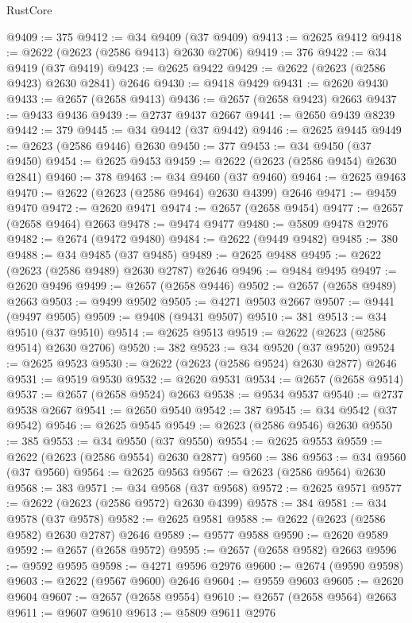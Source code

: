 \begin{lexlean}{RustCore}
\begin{coremodule}
@9409 := 375
@9412 := @34 @9409 (@37 @9409)
@9413 := @2625 @9412
@9418 := @2622 (@2623 (@2586 @9413) @2630 @2706)
@9419 := 376
@9422 := @34 @9419 (@37 @9419)
@9423 := @2625 @9422
@9429 := @2622 (@2623 (@2586 @9423) @2630 @2841) @2646
@9430 := @9418 @9429
@9431 := @2620 @9430
@9433 := @2657 (@2658 @9413)
@9436 := @2657 (@2658 @9423) @2663
@9437 := @9433 @9436
@9439 := @2737 @9437 @2667
@9441 := @2650 @9439 @8239
@9442 := 379
@9445 := @34 @9442 (@37 @9442)
@9446 := @2625 @9445
@9449 := @2623 (@2586 @9446) @2630
@9450 := 377
@9453 := @34 @9450 (@37 @9450)
@9454 := @2625 @9453
@9459 := @2622 (@2623 (@2586 @9454) @2630 @2841)
@9460 := 378
@9463 := @34 @9460 (@37 @9460)
@9464 := @2625 @9463
@9470 := @2622 (@2623 (@2586 @9464) @2630 @4399) @2646
@9471 := @9459 @9470
@9472 := @2620 @9471
@9474 := @2657 (@2658 @9454)
@9477 := @2657 (@2658 @9464) @2663
@9478 := @9474 @9477
@9480 := @5809 @9478 @2976
@9482 := @2674 (@9472 @9480)
@9484 := @2622 (@9449 @9482)
@9485 := 380
@9488 := @34 @9485 (@37 @9485)
@9489 := @2625 @9488
@9495 := @2622 (@2623 (@2586 @9489) @2630 @2787) @2646
@9496 := @9484 @9495
@9497 := @2620 @9496
@9499 := @2657 (@2658 @9446)
@9502 := @2657 (@2658 @9489) @2663
@9503 := @9499 @9502
@9505 := @4271 @9503 @2667
@9507 := @9441 (@9497 @9505)
@9509 := @9408 (@9431 @9507)
@9510 := 381
@9513 := @34 @9510 (@37 @9510)
@9514 := @2625 @9513
@9519 := @2622 (@2623 (@2586 @9514) @2630 @2706)
@9520 := 382
@9523 := @34 @9520 (@37 @9520)
@9524 := @2625 @9523
@9530 := @2622 (@2623 (@2586 @9524) @2630 @2877) @2646
@9531 := @9519 @9530
@9532 := @2620 @9531
@9534 := @2657 (@2658 @9514)
@9537 := @2657 (@2658 @9524) @2663
@9538 := @9534 @9537
@9540 := @2737 @9538 @2667
@9541 := @2650 @9540
@9542 := 387
@9545 := @34 @9542 (@37 @9542)
@9546 := @2625 @9545
@9549 := @2623 (@2586 @9546) @2630
@9550 := 385
@9553 := @34 @9550 (@37 @9550)
@9554 := @2625 @9553
@9559 := @2622 (@2623 (@2586 @9554) @2630 @2877)
@9560 := 386
@9563 := @34 @9560 (@37 @9560)
@9564 := @2625 @9563
@9567 := @2623 (@2586 @9564) @2630
@9568 := 383
@9571 := @34 @9568 (@37 @9568)
@9572 := @2625 @9571
@9577 := @2622 (@2623 (@2586 @9572) @2630 @4399)
@9578 := 384
@9581 := @34 @9578 (@37 @9578)
@9582 := @2625 @9581
@9588 := @2622 (@2623 (@2586 @9582) @2630 @2787) @2646
@9589 := @9577 @9588
@9590 := @2620 @9589
@9592 := @2657 (@2658 @9572)
@9595 := @2657 (@2658 @9582) @2663
@9596 := @9592 @9595
@9598 := @4271 @9596 @2976
@9600 := @2674 (@9590 @9598)
@9603 := @2622 (@9567 @9600) @2646
@9604 := @9559 @9603
@9605 := @2620 @9604
@9607 := @2657 (@2658 @9554)
@9610 := @2657 (@2658 @9564) @2663
@9611 := @9607 @9610
@9613 := @5809 @9611 @2976

\end{coremodule}
\end{lexlean}
